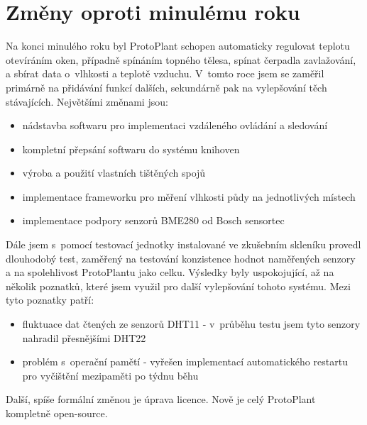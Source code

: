 \chapter{Změny oproti minulému roku}
Na konci minulého roku byl ProtoPlant schopen automaticky regulovat teplotu otevíráním oken, případně spínáním topného tělesa, spínat čerpadla zavlažování, a sbírat data o~vlhkosti a teplotě vzduchu. V~tomto roce jsem se zaměřil primárně na přidávání funkcí dalších, sekundárně pak na vylepšování těch stávajících.
Největšími změnami jsou: 
\begin{itemize}
    \item nádstavba softwaru pro implementaci vzdáleného ovládání a sledování
	\item kompletní přepsání softwaru do systému knihoven
	\item výroba a použití vlastních tištěných spojů
	\item implementace frameworku pro měření vlhkosti půdy na jednotlivých místech
	\item implementace podpory senzorů BME280 od Bosch sensortec
\end{itemize}

Dále jsem s~pomocí testovací jednotky instalované ve zkušebním skleníku provedl dlouhodobý test, zaměřený na testování konzistence hodnot naměřených senzory a na spolehlivost ProtoPlantu jako celku. Výsledky byly uspokojující, až na několik poznatků, které jsem využil pro další vylepšování tohoto systému. Mezi tyto poznatky patří:
\begin{itemize}
    \item fluktuace dat čtených ze senzorů DHT11 - v~průběhu testu jsem tyto senzory nahradil přesnějšími DHT22
    \item problém s~operační pamětí - vyřešen implementací automatického restartu pro vyčištění mezipaměti po týdnu běhu
\end{itemize}

Další, spíše formální změnou je úprava licence. Nově je celý ProtoPlant kompletně open-source.
\newpage

